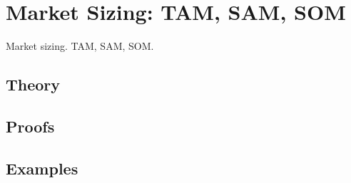 
\section{Market Sizing: TAM, SAM, SOM}
\label{sec:2.6.02-market-sizing}

\begin{ticket}
Market sizing. TAM, SAM, SOM.
\end{ticket}

\subsection*{Theory}

\subsection*{Proofs}

\subsection*{Examples}
